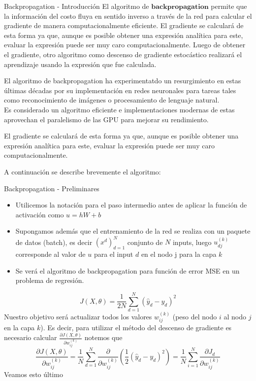 \documentclass[9pt]{beamer}
\begin{document}
\begin{frame}{Backpropagation - Introducción}
El algoritmo de $\textbf{backpropagation}$ permite que la información del costo fluya en sentido inverso a través de la red para calcular el gradiente de manera computacionalmente eficiente.  \pause 
El gradiente se calculará de esta forma ya que, aunque es posible obtener una expresión analítica para este, evaluar la expresión puede ser muy caro computacionalmente. 
\pause Luego de obtener el gradiente, otro algoritmo como descenso de gradiente estocástico realizará el aprendizaje usando la expresión que fue calculada. \pause

\vspace{0.2cm}

El algoritmo de backpropagation ha experimentatdo un resurgimiento en estas últimas décadas por su implementación en redes neuronales para tareas tales como reconocimiento de imágenes o procesamiento de lenguaje natural. \\
Es considerado un algoritmo eficiente e implementaciones modernas de estas aprovechan el paralelismo de las GPU para mejorar su rendimiento. \pause

\vspace{0.2cm}El gradiente se
calculará de esta forma ya que, aunque es posible obtener una expresión analítica para este, evaluar
la expresión puede ser muy caro computacionalmente.

A continuación se describe brevemente el algoritmo: 

\end{frame}

\begin{frame}{Backpropagation - Preliminares}

\begin{itemize}
  \item Utilicemos la notación para el paso intermedio antes de aplicar la función de activación como $u = hW + b$ \pause

  \item Supongamos además que el entrenamiento de la red se realiza con un paquete de datos (batch), es decir $(x^d)_{d=1}^N$  conjunto de $N$ inputs, luego $u_{dj}^{(k)}$ corresponde al valor de $u$ para el input $d$ en el nodo j para la capa $k$ \pause
 
 \item Se verá el algoritmo de backpropagation para función de error MSE en un problema de regresión.  \pause

\end{itemize} 
\[
J(X , \theta) = \frac{1}{2N}\sum_{d=1}^N(\hat{y}_d-y_d)^2
\]
Nuestro objetivo será actualizar todos los valores $w_{ij}^{(k)}$ (peso del nodo $i$ al nodo $j$ en la capa $k$). Es decir, para utilizar el método del descenso de gradiente es necesario calcular $\frac{\partial J(X , \theta) }{\partial w_{ij}^{(k)}}$ notemos que \pause
\[
\frac{\partial J(X , \theta) }{\partial w_{ij}^{(k)}} = \frac{1}{N}\sum_{d=1}^N \frac{\partial}{\partial w_{ij}^{(k)}} \left ( \frac{1}{2}(\hat{y}_d-y_d)^2 \right) = \frac{1}{N}\sum_{i=1}^N \frac{\partial J_d}{\partial w_{ij}^{(k)}}
\]
Veamos esto último
\end{frame}
\end{document}
